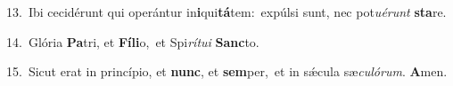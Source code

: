 {\numbfont\textcolor{\numbcolor}{13.}}~Ibi cecidérunt qui operántur in\-\textbf{i}\-qui\-\textbf{tá}\-tem:~\star expúlsi sunt, nec pot\-\textit{u}\-\textit{é}\textit{runt} \textbf{sta}\-re.\par
{\numbfont\textcolor{\numbcolor}{14.}}~Glória \textbf{Pa}\-tri, et \textbf{Fí}\-\textbf{li}o,~\star et Spi\-\textit{rí}\-\textit{tu}\textit{i} \textbf{Sanc}\-to.\par
{\numbfont\textcolor{\numbcolor}{15.}}~Sicut erat in princípio, et \textbf{nunc}\-, et \textbf{sem}\-per,~\star et in sǽcula sæ\-\textit{cu}\-\textit{ló}\textit{rum}. \textbf{A}\-men.\par
